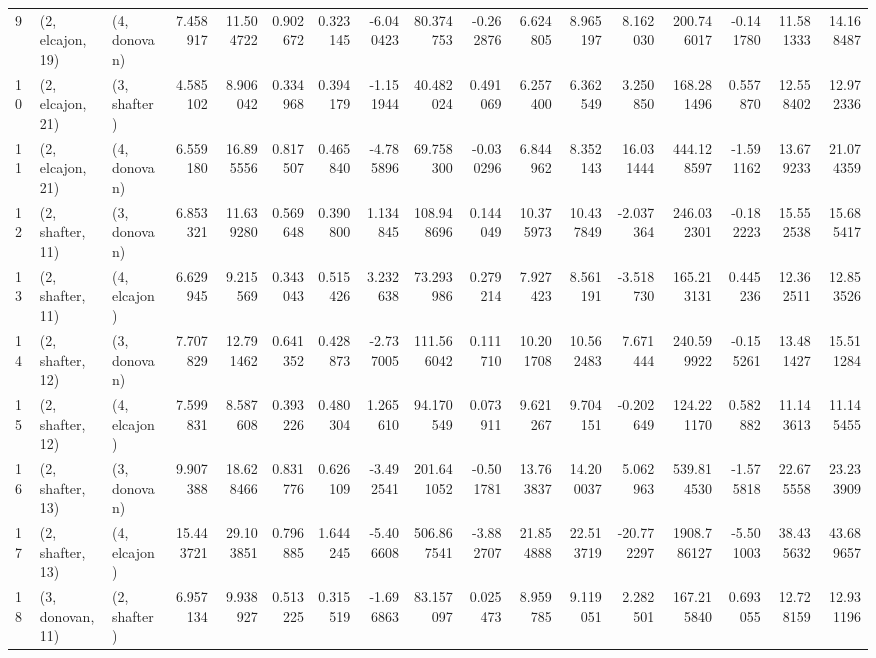 \begin{tabular}{lllrrrrrrrrrrrrrr}
9  &  (2, elcajon, 19) &     (4, donovan) &   7.458917 &  11.504722 &   0.902672 &  0.323145 &  -6.040423 &    80.374753 &  -0.262876 &   6.624805 &   8.965197 &   8.162030 &   200.746017 & -0.141780 &  11.581333 &  14.168487 \\
10 &  (2, elcajon, 21) &     (3, shafter) &   4.585102 &   8.906042 &   0.334968 &  0.394179 &  -1.151944 &    40.482024 &   0.491069 &   6.257400 &   6.362549 &   3.250850 &   168.281496 &  0.557870 &  12.558402 &  12.972336 \\
11 &  (2, elcajon, 21) &     (4, donovan) &   6.559180 &  16.895556 &   0.817507 &  0.465840 &  -4.785896 &    69.758300 &  -0.030296 &   6.844962 &   8.352143 &  16.031444 &   444.128597 & -1.591162 &  13.679233 &  21.074359 \\
12 &  (2, shafter, 11) &     (3, donovan) &   6.853321 &  11.639280 &   0.569648 &  0.390800 &   1.134845 &   108.948696 &   0.144049 &  10.375973 &  10.437849 &  -2.037364 &   246.032301 & -0.182223 &  15.552538 &  15.685417 \\
13 &  (2, shafter, 11) &     (4, elcajon) &   6.629945 &   9.215569 &   0.343043 &  0.515426 &   3.232638 &    73.293986 &   0.279214 &   7.927423 &   8.561191 &  -3.518730 &   165.213131 &  0.445236 &  12.362511 &  12.853526 \\
14 &  (2, shafter, 12) &     (3, donovan) &   7.707829 &  12.791462 &   0.641352 &  0.428873 &  -2.737005 &   111.566042 &   0.111710 &  10.201708 &  10.562483 &   7.671444 &   240.599922 & -0.155261 &  13.481427 &  15.511284 \\
15 &  (2, shafter, 12) &     (4, elcajon) &   7.599831 &   8.587608 &   0.393226 &  0.480304 &   1.265610 &    94.170549 &   0.073911 &   9.621267 &   9.704151 &  -0.202649 &   124.221170 &  0.582882 &  11.143613 &  11.145455 \\
16 &  (2, shafter, 13) &     (3, donovan) &   9.907388 &  18.628466 &   0.831776 &  0.626109 &  -3.492541 &   201.641052 &  -0.501781 &  13.763837 &  14.200037 &   5.062963 &   539.814530 & -1.575818 &  22.675558 &  23.233909 \\
17 &  (2, shafter, 13) &     (4, elcajon) &  15.443721 &  29.103851 &   0.796885 &  1.644245 &  -5.406608 &   506.867541 &  -3.882707 &  21.854888 &  22.513719 & -20.772297 &  1908.786127 & -5.501003 &  38.435632 &  43.689657 \\
18 &  (3, donovan, 11) &     (2, shafter) &   6.957134 &   9.938927 &   0.513225 &  0.315519 &  -1.696863 &    83.157097 &   0.025473 &   8.959785 &   9.119051 &   2.282501 &   167.215840 &  0.693055 &  12.728159 &  12.931196 \\

\end{tabular}
